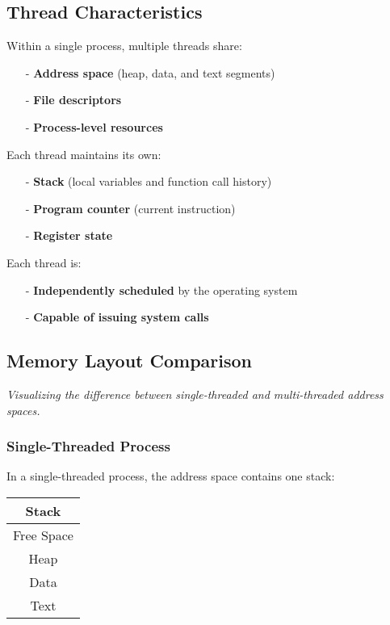 \documentclass[../../compsys.tex]{subfiles}
\begin{document}
\subsection{Thread Characteristics}
Within a single process, multiple threads share:
\begin{itemize}
  \item[-] \textbf{Address space} (heap, data, and text segments)
  \item[-] \textbf{File descriptors}
  \item[-] \textbf{Process-level resources}
\end{itemize}

Each thread maintains its own:
\begin{itemize}
  \item[-] \textbf{Stack} (local variables and function call history)
  \item[-] \textbf{Program counter} (current instruction)
  \item[-] \textbf{Register state}
\end{itemize}

Each thread is:
\begin{itemize}
  \item[-] \textbf{Independently scheduled} by the operating system
  \item[-] \textbf{Capable of issuing system calls}
\end{itemize}

\subsection{Memory Layout Comparison}
\textit{Visualizing the difference between single-threaded and multi-threaded address spaces.}

\subsubsection{Single-Threaded Process}
In a single-threaded process, the address space contains one stack:
\begin{center}
\begin{tabular}{|c|}
\hline
Stack \\
\hline
Free Space \\
\hline
Heap \\
\hline
Data \\
\hline
Text \\
\hline
\end{tabular}
\end{center}
\end{document}
